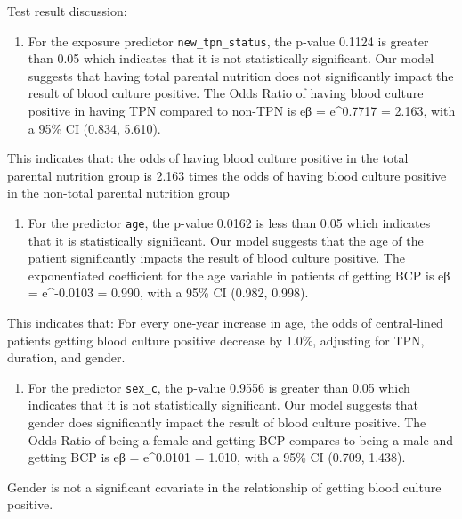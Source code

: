 \documentclass[
]{article}
\providecommand{\tightlist}{%
  \setlength{\itemsep}{0pt}\setlength{\parskip}{0pt}}
\begin{document}
Test result discussion:

\begin{enumerate}
\def\labelenumi{\arabic{enumi}.}
\tightlist
\item
  For the exposure predictor \texttt{new\_tpn\_status}, the p-value
  0.1124 is greater than 0.05 which indicates that it is not
  statistically significant. Our model suggests that having total
  parental nutrition does not significantly impact the result of blood
  culture positive. The Odds Ratio of having blood culture positive in
  having TPN compared to non-TPN is eβ = e\^{}0.7717 = 2.163, with a
  95\% CI (0.834, 5.610).
\end{enumerate}

This indicates that: the odds of having blood culture positive in the
total parental nutrition group is 2.163 times the odds of having blood
culture positive in the non-total parental nutrition group

\begin{enumerate}
\def\labelenumi{\arabic{enumi}.}
\setcounter{enumi}{1}
\tightlist
\item
  For the predictor \texttt{age}, the p-value 0.0162 is less than 0.05
  which indicates that it is statistically significant. Our model
  suggests that the age of the patient significantly impacts the result
  of blood culture positive. The exponentiated coefficient for the age
  variable in patients of getting BCP is eβ = e\^{}-0.0103 = 0.990, with
  a 95\% CI (0.982, 0.998).
\end{enumerate}

This indicates that: For every one-year increase in age, the odds of
central-lined patients getting blood culture positive decrease by 1.0\%,
adjusting for TPN, duration, and gender.

\begin{enumerate}
\def\labelenumi{\arabic{enumi}.}
\setcounter{enumi}{2}
\tightlist
\item
  For the predictor \texttt{sex\_c}, the p-value 0.9556 is greater than
  0.05 which indicates that it is not statistically significant. Our
  model suggests that gender does significantly impact the result of
  blood culture positive. The Odds Ratio of being a female and getting
  BCP compares to being a male and getting BCP is eβ = e\^{}0.0101 =
  1.010, with a 95\% CI (0.709, 1.438).
\end{enumerate}

Gender is not a significant covariate in the relationship of getting
blood culture positive.
\end{document}
